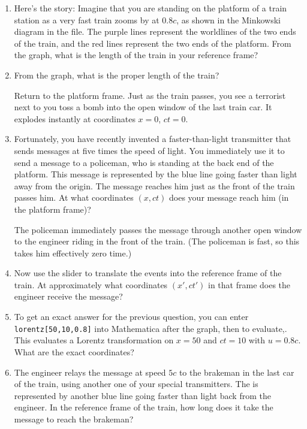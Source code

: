 \begin{enumerate}[wide]
\item Here's the story: Imagine that you are standing on the platform of a train station as a
very fast train zooms by at $0.8c$, as shown in the Minkowski diagram in the file. The purple lines represent the worldlines of the two ends of the train, and the red lines represent the two ends of the platform. From the graph, what is the length of the train in your reference frame?
\answerspace{0.7in}

\item From the graph, what is the proper length of the train?
\answerspace{0.7in}

Return to the platform frame.  Just as the train passes, you see a terrorist next to you toss a bomb into the open window of the last train car. It explodes instantly at coordinates $x = 0$, $ct = 0$.

\item Fortunately, you have recently invented a faster-than-light transmitter that sends messages at five times the speed of light. You immediately use it to send a message to a policeman, who is standing at the back end of the platform. This message is represented by the blue line going faster than light away from the origin.  The message reaches him just as the front of the train passes him. At what coordinates $(x,ct)$ does your message reach him (in the platform frame)?
\answerspace{0.7in}

The policeman immediately passes the message through another open window to the engineer riding in the front of the train. (The policeman is fast, so this takes him effectively zero time.)

\item Now use the slider to translate the events into the reference frame of the train. At approximately what coordinates 
$(x', ct')$ in that frame does the engineer receive the message?
\answerspace{0.7in}

\item To get an exact answer for the previous question, you can enter \verb!lorentz[50,10,0.8]!
into Mathematica after the graph, then  to evaluate,.  This evaluates a Lorentz transformation on $x=50$ and $ct=10$ with $u=0.8c$.  What are the exact coordinates?
\answerspace{0.7in}

\item The engineer relays the message at speed $5c$ to the brakeman in the last car of the train, using another one of your special transmitters. The is represented by another blue line going faster than light back from the engineer.  In the reference frame of the train, how long does it take the message to reach the brakeman?
\answerspace{0.7in}


\end{enumerate}
